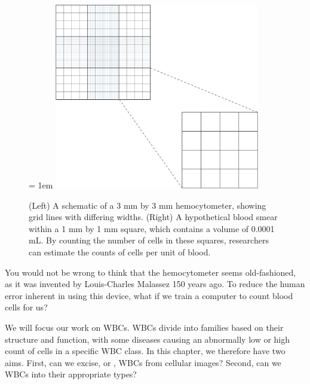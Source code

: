\begin{figure}[h]
\centering
\tabcolsep = 1em
\mySfFamily
\includegraphics[width = 0.8\textwidth]{../images/hemocytometer.png}
\caption{(Left) A schematic of a 3 mm by 3 mm hemocytometer, showing grid lines with differing widths. (Right) A hypothetical blood smear within a 1 mm by 1 mm square, which contains a volume of 0.0001 mL. By counting the number of cells in these squares, researchers can estimate the counts of cells per unit of blood.}
\label{fig:hemocytometer}
\end{figure}

\begin{qbox}\end{qbox}

You would not be wrong to think that the hemocytometer seems old-fashioned, as it was invented by Louis-Charles Malassez 150 years ago. To reduce the human error inherent in using this device, what if we train a computer to count blood cells for us?

We will focus our work on WBCs. WBCs divide into families based on their structure and function, with some diseases causing an abnormally low or high count of cells in a specific WBC class. In this chapter, we therefore have two aims. First, can we excise, or , WBCs from cellular images?  Second, can we  WBCs into their appropriate types?

